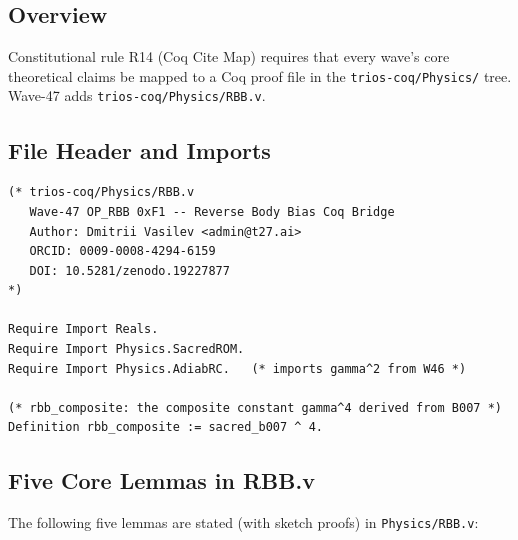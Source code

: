 \subsection{Overview}

Constitutional rule R14 (Coq Cite Map) requires that every wave's core
theoretical claims be mapped to a Coq proof file in the
\texttt{trios-coq/Physics/} tree.
Wave-47 adds \texttt{trios-coq/Physics/RBB.v}.

\subsection{File Header and Imports}

\begin{verbatim}
(* trios-coq/Physics/RBB.v
   Wave-47 OP_RBB 0xF1 -- Reverse Body Bias Coq Bridge
   Author: Dmitrii Vasilev <admin@t27.ai>
   ORCID: 0009-0008-4294-6159
   DOI: 10.5281/zenodo.19227877
*)

Require Import Reals.
Require Import Physics.SacredROM.
Require Import Physics.AdiabRC.   (* imports gamma^2 from W46 *)

(* rbb_composite: the composite constant gamma^4 derived from B007 *)
Definition rbb_composite := sacred_b007 ^ 4.
\end{verbatim}

\subsection{Five Core Lemmas in RBB.v}

The following five lemmas are stated (with sketch proofs) in
\texttt{Physics/RBB.v}:

